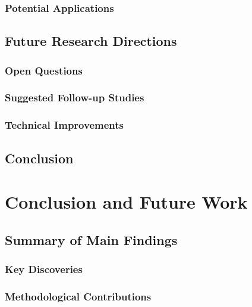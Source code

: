 \documentclass[
  11pt,
  a4paper,
]{report}
\begin{document}
\subsection{Potential Applications}\label{potential-applications}

\section{Future Research Directions}\label{future-research-directions}

\subsection{Open Questions}\label{open-questions}

\subsection{Suggested Follow-up
Studies}\label{suggested-follow-up-studies}

\subsection{Technical Improvements}\label{technical-improvements}

\section{Conclusion}\label{conclusion}


\chapter{Conclusion and Future Work}\label{conclusion-and-future-work}

\section{Summary of Main Findings}\label{summary-of-main-findings}

\subsection{Key Discoveries}\label{key-discoveries}

\subsection{Methodological
Contributions}\label{methodological-contributions}
\end{document}
